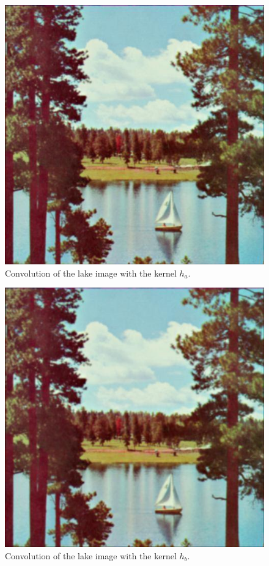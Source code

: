 \begin{figure}[]
    \centering
    \includegraphics[width=1.00\textwidth]{figures/image_processed/convolved_im_h_a.jpg}
    \caption{Convolution of the lake image with the kernel $h_a$.}
    \label{fig:convolution_h_a}
\end{figure}

\begin{figure}[]
    \centering
    \includegraphics[width=1.00\textwidth]{figures/image_processed/convolved_im_h_b.jpg}
    \caption{Convolution of the lake image with the kernel $h_b$.}
    \label{fig:convolution_h_b}
\end{figure}
